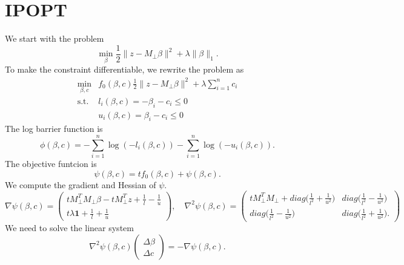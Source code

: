\documentclass{article}
\begin{document}
\section{IPOPT}
We start with the problem
\begin{equation}
    \min_{\beta} \frac{1}{2}\|z-M_{\perp}\beta\|^2 +\lambda\|\beta\|_1.
\end{equation}
To make the constraint differentiable, we rewrite the problem as
\begin{equation}
    \begin{aligned}
        \min_{\beta, c} &f_0(\beta, c)\frac{1}{2}\|z-M_{\perp}\beta\|^2+\lambda\sum_{i=1}^n c_i\\
        \text{s.t. }&l_i(\beta, c) = -\beta_i-c_i\leq 0\\
        &u_i(\beta, c) = \beta_i-c_i\leq 0
        \end{aligned}
\end{equation}
The log barrier function is
\begin{equation}
    \phi(\beta, c) = -\sum_{i=1}^n\log(-l_i(\beta,c))-\sum_{i=1}^n\log(-u_i(\beta,c)).
\end{equation}
The objective funtcion is
\begin{equation}
    \psi(\beta, c) = t f_0(\beta, c)+\psi(\beta, c).
\end{equation}
We compute the gradient and Hessian of $\psi$.
\begin{equation}
    \nabla\psi(\beta, c) = \begin{pmatrix}
        tM_{\perp}^TM_{\perp}\beta-tM_{\perp}^Tz+\frac{1}{l}-\frac{1}{u}\\
        t\lambda\boldsymbol{1}+\frac{1}{l}+\frac{1}{u}
    \end{pmatrix},\quad
    \nabla^2\psi(\beta,c)=\begin{pmatrix}
        tM_{\perp}^TM_{\perp}+diag\big(\frac{1}{l^2}+\frac{1}{u^2}\big) &diag\big(\frac{1}{l^2}-\frac{1}{u^2}\big)\\
        diag\big(\frac{1}{l^2}-\frac{1}{u^2}\big)
        &diag\big(\frac{1}{l^2}+\frac{1}{u^2}\big).
    \end{pmatrix}
\end{equation}
We need to solve the linear system
\begin{equation}
    \nabla^2 \psi(\beta,c)\begin{pmatrix}
        \Delta \beta\\
        \Delta c
    \end{pmatrix} = -\nabla \psi(\beta, c).
\end{equation}
\end{document}
